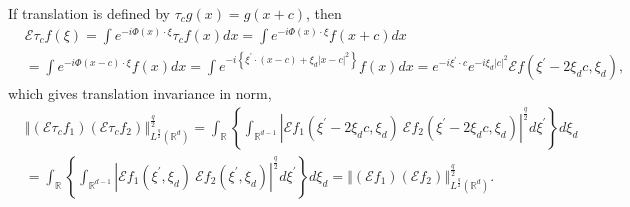 \documentclass{amsart}%
\theoremstyle{plain}
\numberwithin{equation}{section}
\begin{document}
If translation is defined by $\tau_{c}g\left(  x\right)  =g\left(  x+c\right)
$, then%
\begin{align*}
&  \mathcal{E}\tau_{c}f\left(  \xi\right)  =\int e^{-i\Phi\left(  x\right)
\cdot\xi}\tau_{c}f\left(  x\right)  dx=\int e^{-i\Phi\left(  x\right)
\cdot\xi}f\left(  x+c\right)  dx\\
&  =\int e^{-i\Phi\left(  x-c\right)  \cdot\xi}f\left(  x\right)  dx=\int
e^{-i\left\{  \xi^{\prime}\cdot\left(  x-c\right)  +\xi_{d}\left\vert
x-c\right\vert ^{2}\right\}  }f\left(  x\right)  dx=e^{-i\xi^{\prime}\cdot
c}e^{-i\xi_{d}\left\vert c\right\vert ^{2}}\mathcal{E}f\left(  \xi^{\prime
}-2\xi_{d}c,\xi_{d}\right)  ,
\end{align*}
which gives translation invariance in norm,%
\begin{align}
&  \left\Vert \left(  \mathcal{E}\tau_{c}f_{1}\right)  \left(  \mathcal{E}%
\tau_{c}f_{2}\right)  \right\Vert _{L^{\frac{q}{2}}\left(  \mathbb{R}%
^{d}\right)  }^{\frac{q}{2}}=\int_{\mathbb{R}}\left\{  \int_{\mathbb{R}^{d-1}%
}\left\vert \mathcal{E}f_{1}\left(  \xi^{\prime}-2\xi_{d}c,\xi_{d}\right)
\ \mathcal{E}f_{2}\left(  \xi^{\prime}-2\xi_{d}c,\xi_{d}\right)  \right\vert
^{\frac{q}{2}}d\xi^{\prime}\right\}  d\xi_{d}\label{trans}\\
&  =\int_{\mathbb{R}}\left\{  \int_{\mathbb{R}^{d-1}}\left\vert \mathcal{E}%
f_{1}\left(  \xi^{\prime},\xi_{d}\right)  \ \mathcal{E}f_{2}\left(
\xi^{\prime},\xi_{d}\right)  \right\vert ^{\frac{q}{2}}d\xi^{\prime}\right\}
d\xi_{d}=\left\Vert \left(  \mathcal{E}f_{1}\right)  \left(  \mathcal{E}%
f_{2}\right)  \right\Vert _{L^{\frac{q}{2}}\left(  \mathbb{R}^{d}\right)
}^{\frac{q}{2}}.\nonumber
\end{align}
\end{document}
